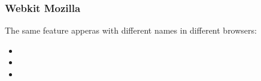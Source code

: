 \begin{frame}[fragile]
\frametitle{Webkit Mozilla}
\color{structure}
The same feature apperas with different names in different browsers:
\begin{itemize}\color{structure}
  \item {}
  \item {}
  \item {}
\end{itemize}
\end{frame}

